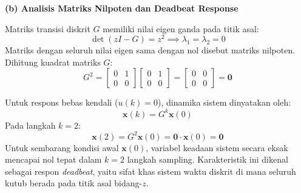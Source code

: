 \documentclass[11pt,a4paper]{article}
\begin{document}
\textbf{(b) Analisis Matriks Nilpoten dan Deadbeat Response}

Matriks transisi diskrit $G$ memiliki nilai eigen ganda pada titik asal:
$$\det(zI - G) = z^2 \implies \lambda_1 = \lambda_2 = 0$$
Matriks dengan seluruh nilai eigen sama dengan nol disebut matriks nilpoten.
Dihitung kuadrat matriks $G$:
$$G^2 = \begin{bmatrix} 0 & 1 \\ 0 & 0 \end{bmatrix} \begin{bmatrix} 0 & 1 \\ 0 & 0 \end{bmatrix} = \begin{bmatrix} 0 & 0 \\ 0 & 0 \end{bmatrix} = \mathbf{0}$$

Untuk respons bebas kendali ($u(k) = 0$), dinamika sistem dinyatakan oleh:
$$\mathbf{x}(k) = G^k \mathbf{x}(0)$$
Pada langkah $k = 2$:
$$\mathbf{x}(2) = G^2 \mathbf{x}(0) = \mathbf{0} \cdot \mathbf{x}(0) = \mathbf{0}$$
Untuk sembarang kondisi awal $\mathbf{x}(0)$, variabel keadaan sistem secara eksak mencapai nol tepat dalam $k = 2$ langkah sampling. Karakteristik ini dikenal sebagai respon \textit{deadbeat}, yaitu sifat khas sistem waktu diskrit di mana seluruh kutub berada pada titik asal bidang-$z$.
\end{document}
